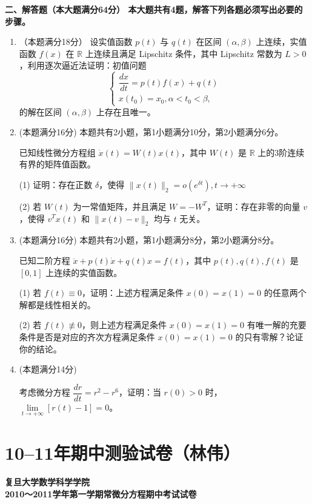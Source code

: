 \textbf{二、解答题（本大题满分64分）
本大题共有4题，解答下列各题必须写出必要的步骤。}
\begin{enumerate}
\item[5.] （本题满分18分）
设实值函数 $p(t)$ 与 $q(t)$ 在区间 $(\alpha, \beta)$ 上连续，实值函数 $f(x)$ 在 $\mathbb{R}$ 上连续且满足 Lipschitz 条件，其中 Lipschitz 常数为 $L > 0$，利用逐次逼近法证明：初值问题
\[
\begin{cases}
\dfrac{dx}{dt} = p(t)f(x) + q(t) \\
x(t_0) = x_0, \alpha < t_0 < \beta,
\end{cases}
\]
的解在区间 $(\alpha, \beta)$ 上存在且唯一。

\item[6.] (本题满分16分)
本题共有2小题，第1小题满分10分，第2小题满分6分。

已知线性微分方程组 $\dot{x}(t) = W(t)x(t)$，其中 $W(t)$ 是 $\mathbb{R}$ 上的$3$阶连续有界的矩阵值函数。

(1) 证明：存在正数 $\delta$，使得 $\|x(t)\|_2 = o(e^{\delta t}), t \to +\infty$

(2) 若 $W(t)$ 为一常值矩阵，并且满足 $W = -W^T$，证明：存在非零的向量 $v$，使得 $v^T x(t)$ 和 $\|x(t) - v\|_2$ 均与 $t$ 无关。

\item[7.] (本题满分16分)
本题共有2小题，第1小题满分8分，第2小题满分8分。

已知二阶方程 $\ddot{x} + p(t)\dot{x} + q(t)x = f(t)$，其中 $p(t), q(t), f(t)$ 是 $[0, 1]$ 上连续的实值函数。

(1) 若 $f(t) \equiv 0$，证明：上述方程满足条件 $x(0) = x(1) = 0$ 的任意两个解都是线性相关的。

(2) 若 $f(t) \not\equiv 0$，则上述方程满足条件 $x(0) = x(1) = 0$ 有唯一解的充要条件是否是对应的齐次方程满足条件 $x(0) = x(1) = 0$ 的只有零解？论证你的结论。

\item[8.] (本题满分14分)

考虑微分方程 $\dfrac{dr}{dt} = r^2 - r^6$，证明：当 $r(0) > 0$ 时，$\lim\limits_{t \to +\infty}[r(t) - 1] = 0$。
\end{enumerate}
\section{10--11年期中测验试卷（林伟）}

\textbf{复旦大学数学科学学院\\
2010～2011学年第一学期常微分方程期中考试试卷}

